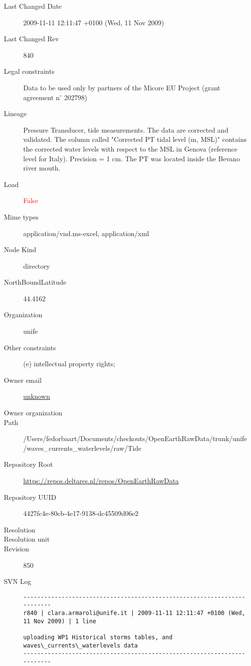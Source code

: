 \documentclass[9]{report}
\begin{document}
\begin{description}
  \item[Last Changed Date] 2009-11-11 12:11:47 +0100 (Wed, 11 Nov 2009)
  \item[Last Changed Rev] 840
  \item[Legal constraints] Data to be used only by partners of the Micore EU Project (grant agreement n\mbox{$^\circ$} 202798)
  \item[Lineage] Pressure Transducer, tide measurements. The data are corrected and validated. The column called "Corrected PT tidal level (m, MSL)" contains the corrected water levels with respect to the MSL in Genova (reference level for Italy). Precision = 1 cm. The PT was located inside the Bevano river mouth.
  \item[Load] \textcolor{red}{False}
  \item[Mime types] application/vnd.ms-excel, application/xml
  \item[Node Kind] directory
  \item[NorthBoundLatitude] 44.4162
  \item[Organization] unife
  \item[Other constraints] (e) intellectual property rights;
  \item[Owner email] \href{mailto:unknown}{unknown}
  \item[Owner organization] 
  \item[Path] /Users/fedorbaart/Documents/checkouts/OpenEarthRawData/trunk/unife/waves\_currents\_waterlevels/raw/Tide
  \item[Repository Root] \href{https://repos.deltares.nl/repos/OpenEarthRawData}{https://repos.deltares.nl/repos/OpenEarthRawData}
  \item[Repository UUID] 4427fc4e-80cb-4e17-9138-dc45509d06e2
  \item[Resolution] 
  \item[Resolution unit] 
  \item[Revision] 850
  \item[SVN Log] \begin{verbatim}
------------------------------------------------------------------------
r840 | clara.armaroli@unife.it | 2009-11-11 12:11:47 +0100 (Wed, 11 Nov 2009) | 1 line

uploading WP1 Historical storms tables, and waves\_currents\_waterlevels data
------------------------------------------------------------------------


\end{verbatim}
\end{description}
\end{document}
